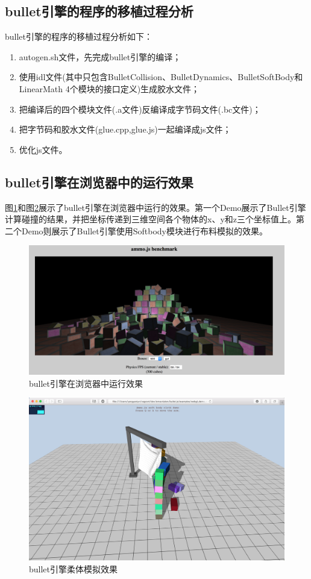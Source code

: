 \subsection{bullet引擎的程序的移植过程分析}

bullet引擎的程序的移植过程分析如下：

\begin{enumerate}
    \item autogen.sh文件，先完成bullet引擎的编译；
    \item 使用idl文件(其中只包含BulletCollision、BulletDynamics、BulletSoftBody和LinearMath 4个模块的接口定义)生成胶水文件；
    \item 把编译后的四个模块文件(.a文件)反编译成字节码文件(.bc文件)；
    \item 把字节码和胶水文件(glue.cpp,glue.js)一起编译成js文件；
	  \item 优化js文件。
\end{enumerate}

\subsection{bullet引擎在浏览器中的运行效果}

图\ref{ammo-sample-html}和图\ref{ammo-cloth}展示了bullet引擎在浏览器中运行的效果。第一个Demo展示了Bullet引擎计算碰撞的结果，并把坐标传递到三维空间各个物体的x、y和z三个坐标值上。第二个Demo则展示了Bullet引擎使用Softbody模块进行布料模拟的效果。

\newpage

\begin{figure}[h!] %
    \centering
    \includegraphics[width=450bp]{figure/pic/ammo-sample-html.png}
    \caption{bullet引擎在浏览器中运行效果}
    \label{ammo-sample-html}
\end{figure}

\begin{figure}[h!] %
    \centering
    \includegraphics[width=450bp]{figure/pic/ammo-cloth.png}
    \caption{bullet引擎柔体模拟效果}
    \label{ammo-cloth}
\end{figure}

